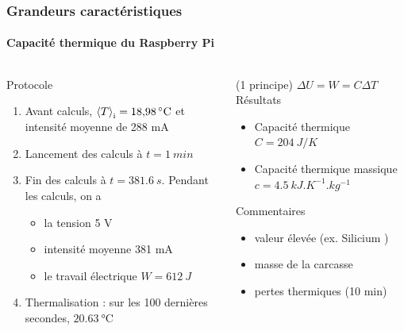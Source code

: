\documentclass[a4paper,11pt]{beamer}
\newcommand{\moy}{\expval}
\newcommand{\cel}{\degreeCelsius}
\begin{document}
\begin{frame}
    \frametitle{Grandeurs caractéristiques}
    \framesubtitle{Capacité thermique du Raspberry Pi}

    \begin{columns}
        \begin{column}{0.5\textwidth}
            Protocole
            \begin{enumerate}
                \item Avant calculs, $\moy{T}_\text{i} = \SI{18,98}{\cel}$ et intensité moyenne de 288 mA
                \item Lancement des calculs à $t = \SI{1}{min}$
                \item Fin des calculs à $t = \SI{381,6}{s}$. Pendant les calculs, on a
                \begin{itemize}
                    \item la tension 5 V
                    \item intensité moyenne 381 mA
                    \item le travail électrique $W = \SI{612}{J}$
                \end{itemize}
                \item Thermalisation : sur les 100 dernières secondes, $\SI{20,63}{\cel}$
            \end{enumerate}
        \end{column}
        \vrule{}
        \begin{column}{0.5\textwidth}
            (1\ier{} principe) $\Delta U = W = C \Delta T$
            Résultats
            \begin{itemize}
                \item Capacité thermique $C = \SI{204}{J/K}$
                \item Capacité thermique massique $c = \SI{4,5}{kJ.K^{-1}.kg^{-1}}$
            \end{itemize}
            Commentaires
            \begin{itemize}
                \item valeur élevée (ex. Silicium )
                \item masse de la carcasse
                \item pertes thermiques (10 min)
            \end{itemize}
        \end{column}
    \end{columns}
\end{frame}
\end{document}
